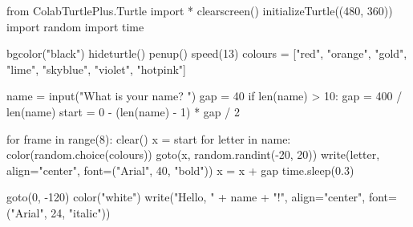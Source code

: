 \begin{typethis}
from ColabTurtlePlus.Turtle import *
clearscreen()
initializeTurtle((480, 360))
import random
import time

bgcolor("black")
hideturtle()
penup()
speed(13)
colours = ["red", "orange", "gold", "lime", "skyblue",
           "violet", "hotpink"]

name = input("What is your name? ")
gap = 40
if len(name) > 10:
    gap = 400 / len(name)
start = 0 - (len(name) - 1) * gap / 2

for frame in range(8):
    clear()
    x = start
    for letter in name:
        color(random.choice(colours))
        goto(x, random.randint(-20, 20))
        write(letter, align="center",
              font=("Arial", 40, "bold"))
        x = x + gap
    time.sleep(0.3)

goto(0, -120)
color("white")
write("Hello, " + name + "!", align="center",
      font=("Arial", 24, "italic"))
\end{typethis}

